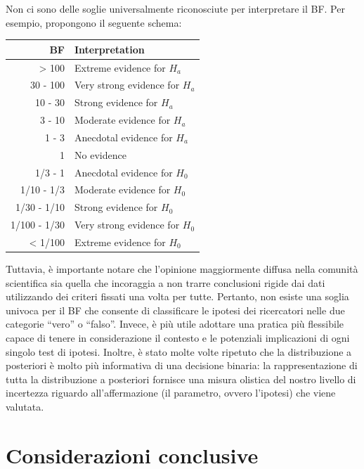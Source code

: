 \documentclass[
  11pt,
  italian,
  a4paper,
  extrafontsizes,onecolumn,openright
  ]{memoir}
\begin{document}
Non ci sono delle soglie universalmente riconosciute per interpretare il BF. Per esempio, \textcite{lee2014bayesian} propongono il seguente schema:

\begin{longtable}[]{@{}rl@{}}
\toprule
BF & Interpretation \\
\midrule
\endhead
\textgreater{} 100 & Extreme evidence for \(H_a\) \\
30 - 100 & Very strong evidence for \(H_a\) \\
10 - 30 & Strong evidence for \(H_a\) \\
3 - 10 & Moderate evidence for \(H_a\) \\
1 - 3 & Anecdotal evidence for \(H_a\) \\
1 & No evidence \\
1/3 - 1 & Anecdotal evidence for \(H_0\) \\
1/10 - 1/3 & Moderate evidence for \(H_0\) \\
1/30 - 1/10 & Strong evidence for \(H_0\) \\
1/100 - 1/30 & Very strong evidence for \(H_0\) \\
\textless{} 1/100 & Extreme evidence for \(H_0\) \\
\bottomrule
\end{longtable}

Tuttavia, è importante notare che l'opinione maggiormente diffusa nella comunità scientifica sia quella che incoraggia a non trarre conclusioni rigide dai dati utilizzando dei criteri fissati una volta per tutte. Pertanto, non esiste una soglia univoca per il BF che consente di classificare le ipotesi dei ricercatori nelle due categorie ``vero'' o ``falso''. Invece, è più utile adottare una pratica più flessibile capace di tenere in considerazione il contesto e le potenziali implicazioni di ogni singolo test di ipotesi. Inoltre, è stato molte volte ripetuto che la distribuzione a posteriori è molto più informativa di una decisione binaria: la rappresentazione di tutta la distribuzione a posteriori fornisce una misura olistica del nostro livello di incertezza riguardo all'affermazione (il parametro, ovvero l'ipotesi) che viene valutata.

\hypertarget{considerazioni-conclusive-1}{%
\section*{Considerazioni conclusive}\label{considerazioni-conclusive-1}}
\end{document}
